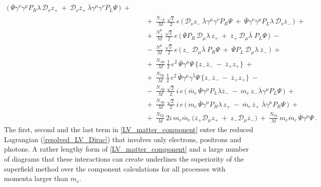 \documentclass[12pt]{revtex4}
\begin{document}
\begin{eqnarray}
\Big(\,
\overline{\Psi} \gamma^\nu\gamma^\mu P_R
\lambda \, \mathcal{D}_\nu z_+ 
~+~
\mathcal{D}_\nu \overline{z}_+ \,
\overline{\lambda} \gamma^\mu \gamma^\nu
P_L \Psi
\,
\Big)
~+~ \\
\nonumber
&&
~+~
\frac{N_{-\mu}}{M}\,
\frac{\sqrt{2}}{2}\,e\,
\Big(\,
\mathcal{D}_\nu z_- \,
\overline{\lambda}\gamma^\mu\gamma^\nu P_R \Psi
~+~
\overline{\Psi}\gamma^\nu\gamma^\mu P_L \lambda
\, \mathcal{D}_\nu \overline{z}_-
\,
\Big)
~+~ \\
\label{LV_matter_component}
&&
~+~
\frac{N_+^\mu}{M}\,
\frac{\sqrt{2}}{2}\, e\,
\Big(\,
\overline{\Psi}P_R\, \mathcal{D}_\mu \lambda
\, z_+ 
~+~
\overline{z}_+ \,
\mathcal{D}_\mu 
\overline{\lambda}\; P_L \Psi
\,\Big)
~-~ \\
\nonumber
&&
~-~
\frac{N_-^\mu}{M}\,
\frac{\sqrt{2}}{2}\, e\,
\Big(\,
z_-\; \mathcal{D}_\mu \overline{\lambda} ~
P_R \Psi 
~+~
\overline{\Psi} P_L \, \mathcal{D}_\mu \lambda ~
\overline{z}_-
\,\Big) 
~+~ \\
\nonumber
&&
~+~ 
\frac{N_{A\mu}}{M}\,
\frac{1}{2}\, e^2\,
\overline{\Psi}\gamma^\mu  \Psi \,
\Big\{
  z_-  \overline{z}_- 
  ~-~
  \overline{z}_+  z_+
\Big\}
~+~ \\
\nonumber
&&
~+~
\frac{N_{V\mu}}{M}\,
\frac{1}{2}\, e^2\,
\overline{\Psi}\gamma^\mu \gamma^5 \Psi \,
\Big\{
  z_-  \overline{z}_- 
  ~-~
  \overline{z}_+  z_+
\Big\}
~-~ \\
\nonumber
&&
~-~
\frac{N_{A\mu}}{M}\,
\frac{\sqrt{2}}{2}\, i\, e\,
\Big(\,
\overline{m}_e\, \overline{\Psi} \gamma^\mu P_L
\lambda \overline{z}_- 
~-~
m_e\, z_- \overline{\lambda}
\gamma^\mu P_L \Psi
\,\Big)
~+~ \\
\nonumber
&&
~+~
\frac{N_{A\mu}}{M}\,
\frac{\sqrt{2}}{2}\, i\, e\,
\Big(\,
m_e\, \overline{\Psi}\gamma^\mu P_R \lambda\, z_+ 
~-~
\overline{m}_e\, \overline{z}_+\; \overline{\lambda}
\gamma^\mu P_R \Psi
\,\Big)
~+~ \\
\nonumber
&&
~+~ 
\frac{N_{V\mu}}{M}\, 2 i\, m_e \overline{m}_e \,
\big( 
\overline{z}_+ \mathcal{D}_\mu z_+ 
~+~
z_- \mathcal{D}_\mu \overline{z}_-
\big)~+~
\frac{N_{V\mu}}{M}\,
m_e \overline{m}_e \,
\overline{\Psi} \gamma^\mu \Psi
~.
\end{eqnarray}
%
The first, second and the last term in \eqref{LV_matter_component}  enter 
the reduced Lagrangian (\ref{resolved_LV_Dirac}) that involves only
electrons, positrons and photons. A rather lengthy form of
\eqref{LV_matter_component} and a large number of diagrams that 
these interactions can create underlines the superiority of the 
superfield method over the component calculations for 
all processes with momenta larger than $m_s$. 
\end{document}
